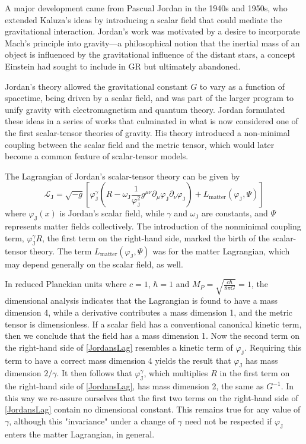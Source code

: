 \documentclass[12pt]{article}
\begin{document}
A major development came from Pascual Jordan in the 1940s and 1950s, who extended Kaluza’s ideas by introducing a scalar field that could mediate the gravitational interaction. 
Jordan’s work was motivated by a desire to incorporate Mach’s principle into gravity—a philosophical notion that the inertial mass of an object is influenced by the gravitational influence of the distant stars, a concept Einstein had sought to include in GR but ultimately abandoned.

Jordan’s theory allowed the gravitational constant $G$ to vary as a function of spacetime, being driven by a scalar field, and was part of the larger program to unify gravity with electromagnetism and quantum theory. 
Jordan formulated these ideas in a series of works that culminated in what is now considered one of the first scalar-tensor theories of gravity. 
His theory introduced a non-minimal coupling between the scalar field and the metric tensor, which would later become a common feature of scalar-tensor models.

The Lagrangian of Jordan’s scalar-tensor theory can be given by
\begin{equation} \label{JordansLag}
    \mathcal{L}_{\mathrm{J}}=\sqrt{-g}\left[\varphi_{\mathrm{J}}^{\gamma}\left(R-\omega_{\mathrm{J}} \frac{1}{\varphi_{\mathrm{J}}^{2}} g^{\mu \nu} \partial_{\mu} \varphi_{\mathrm{J}} \partial_{\nu} \varphi_{\mathrm{J}}\right)+L_{\text {matter}}\left(\varphi_{\mathrm{J}}, \Psi\right)\right]
\end{equation}
where $\varphi_{\mathrm{J}}(x)$ is Jordan's scalar field, while $\gamma$ and $\omega_{\mathrm{J}}$ are constants, and $\Psi$ represents matter fields collectively. The introduction of the nonminimal coupling term, $\varphi_{\mathrm{J}}^{\gamma} R$, the first term on the right-hand side, marked the birth of the scalar-tensor theory. The term $L_{\text {matter}}\left(\varphi_{\mathrm{J}}, \Psi\right)$ was for the matter Lagrangian, which may depend generally on the scalar field, as well.

In reduced Planckian units where $c=1$, $\hbar=1$ and $M_P=\sqrt{\frac{c \hbar}{8 \pi G}}=1$, the dimensional analysis indicates that the Lagrangian is found to have a mass dimension 4, while a derivative contributes a mass dimension 1, and the metric tensor is dimensionless. 
If a scalar field has a conventional canonical kinetic term, then we conclude that the field has a mass dimension 1.
Now the second term on the right-hand side of \eqref{JordansLag} resembles a kinetic term of $\varphi_{\mathrm{J}}$. 
Requiring this term to have a correct mass dimension 4 yields the result that $\varphi_{\mathrm{J}}$ has mass dimension $2 / \gamma$. 
It then follows that $\varphi_{\mathrm{J}}^{\gamma}$, which multiplies $R$ in the first term on the right-hand side of \eqref{JordansLag}, has mass dimension 2, the same as $G^{-1}$. 
In this way we re-assure ourselves that the first two terms on the right-hand side of \eqref{JordansLag} contain no dimensional constant. This remains true for any value of $\gamma$, although this "invariance" under a change of $\gamma$ need not be respected if $\varphi_{\mathrm{J}}$ enters the matter Lagrangian, in general.
\end{document}
